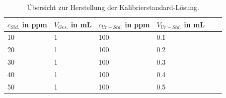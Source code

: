       \begin{table}[H]
      \centering
      \caption[Übersicht zur Herstellung der Kalibrierstandard-Lösung, Quelle: Autor]{Übersicht zur Herstellung der Kalibrierstandard-Lösung.}
      
      \label{tab:Kalibrierstandard}
      \begin{tabular}{@{}llllp{4.5cm}l@{}}
        \toprule
          $c_{Std.}$ in \si{ppm} & $V_{Ges.}$ in \si{\milli\liter} & $c_{Ur-Std.}$ in \si{ppm} & $V_{Ur-Std.}$ in \si{\milli\liter} \\ \midrule
          10 & 1 & 100 & 0.1 \\
          20 & 1 & 100 & 0.2 \\
          30 & 1 & 100 & 0.3 \\
          40 & 1 & 100 & 0.4 \\
          50 & 1 & 100 & 0.5 \\ \bottomrule
      \end{tabular}
    \end{table} 
    
  